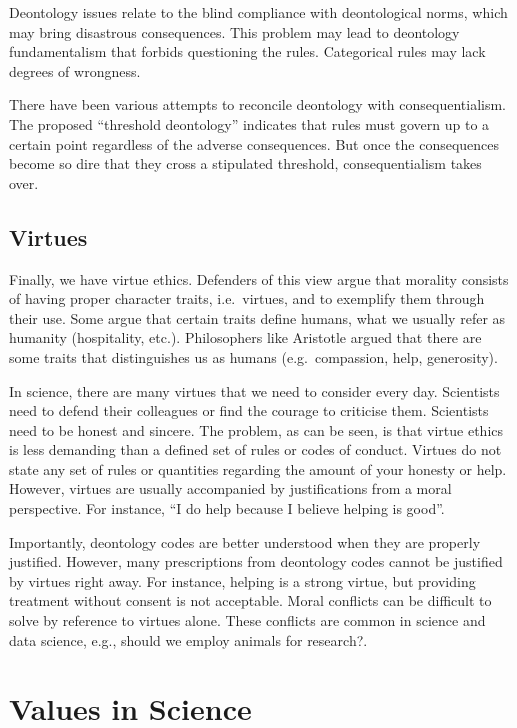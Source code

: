 \documentclass[
  12pt,
]{book}
\begin{document}
Deontology issues relate to the blind compliance with deontological norms, which may bring disastrous consequences. This problem may lead to deontology fundamentalism that forbids questioning the rules. Categorical rules may lack degrees of wrongness.

There have been various attempts to reconcile deontology with consequentialism. The proposed ``threshold deontology'' indicates that rules must govern up to a certain point regardless of the adverse consequences. But once the consequences become so dire that they cross a stipulated threshold, consequentialism takes over.

\subsection{Virtues}\label{virtues}

Finally, we have virtue ethics. Defenders of this view argue that morality consists of having proper character traits, i.e.~virtues, and to exemplify them through their use. Some argue that certain traits define humans, what we usually refer as humanity (hospitality, etc.). Philosophers like Aristotle argued that there are some traits that distinguishes us as humans (e.g.~compassion, help, generosity).

In science, there are many virtues that we need to consider every day. Scientists need to defend their colleagues or find the courage to criticise them. Scientists need to be honest and sincere. The problem, as can be seen, is that virtue ethics is less demanding than a defined set of rules or codes of conduct. Virtues do not state any set of rules or quantities regarding the amount of your honesty or help. However, virtues are usually accompanied by justifications from a moral perspective. For instance, ``I do help because I believe helping is good''.

Importantly, deontology codes are better understood when they are properly justified. However, many prescriptions from deontology codes cannot be justified by virtues right away. For instance, helping is a strong virtue, but providing treatment without consent is not acceptable. Moral conflicts can be difficult to solve by reference to virtues alone. These conflicts are common in science and data science, e.g., should we employ animals for research?.

\section{Values in Science}\label{values-in-science}
\end{document}

